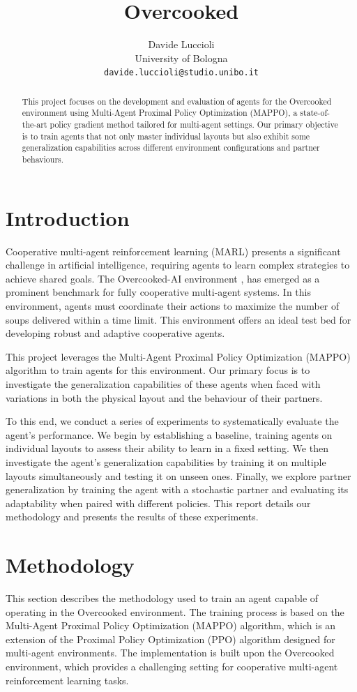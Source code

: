 \documentclass{article}
\title{Overcooked}
\author{
  Davide  Luccioli\\
  University of Bologna\\
  \texttt{davide.luccioli@studio.unibo.it}
}
\begin{document}
\maketitle


\begin{abstract}
  This project focuses on the development and evaluation of agents for the Overcooked environment using Multi-Agent Proximal Policy Optimization (MAPPO), a state-of-the-art policy gradient method tailored for multi-agent settings. Our primary objective is to train agents that not only master individual layouts but also exhibit some generalization capabilities across different environment configurations and partner behaviours.
\end{abstract}


\section{Introduction}
Cooperative multi-agent reinforcement learning (MARL) presents a significant challenge in artificial intelligence, requiring agents to learn complex strategies to achieve shared goals. The Overcooked-AI environment \cite{overcooked}, has emerged as a prominent benchmark for fully cooperative multi-agent systems. In this environment, agents must coordinate their actions to maximize the number of soups delivered within a time limit. This environment offers an ideal test bed for developing robust and adaptive cooperative agents.

This project leverages the Multi-Agent Proximal Policy Optimization (MAPPO) algorithm to train agents for this environment. Our primary focus is to investigate the generalization capabilities of these agents when faced with variations in both the physical layout and the behaviour of their partners.

To this end, we conduct a series of experiments to systematically evaluate the agent's performance. We begin by establishing a baseline, training agents on individual layouts to assess their ability to learn in a fixed setting. We then investigate the agent's generalization capabilities by training it on multiple layouts simultaneously and testing it on unseen ones. Finally, we explore partner generalization by training the agent with a stochastic partner and evaluating its adaptability when paired with different policies. This report details our methodology and presents the results of these experiments.

\section{Methodology}
This section describes the methodology used to train an agent capable of operating in the Overcooked environment. The training process is based on the Multi-Agent Proximal Policy Optimization (MAPPO) algorithm, which is an extension of the Proximal Policy Optimization (PPO) algorithm designed for multi-agent environments. The implementation is built upon the Overcooked environment, which provides a challenging setting for cooperative multi-agent reinforcement learning tasks.
\end{document}
